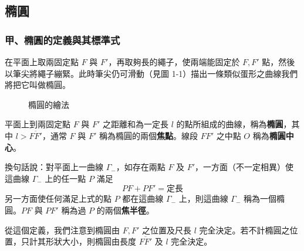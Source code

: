 \subsection{橢圓}
\label{sec:b4-3-1}

\subsubsection*{甲、橢圓的定義與其標準式}

在平面上取兩固定點 $F$ 與 $F'$，再取夠長的繩子，使兩端能固定於 $F, F'$ 點，然後以筆尖將繩子繃緊。此時筆尖仍可滑動（見圖 1-1）描出一條類似蛋形之曲線我們將把它叫做橢圓。

\begin{figure}[htbp]
\centering
{}
\caption{橢圓的繪法}
\label{fig:b4-3-1}
\end{figure}

\begin{definition*}
平面上到兩固定點 $F$ 與 $F'$ 之距離和為一定長 $l$ 的點所組成的曲線，稱為\textbf{橢圓}，其中 $l > \overline{FF'}$，通常 $F$ 與 $F'$ 稱為橢圓的兩個\textbf{焦點}。線段 $FF'$ 之中點 $O$ 稱為\textbf{橢圓中心}。

換句話說：對平面上一曲線 $\Gamma_-$，如存在兩點 $F$ 及 $F'$，一方面（不一定相異）使這曲線 $\Gamma_-$ 上的任一點 $P$ 滿足
\begin{equation}
PF + PF' = \text{定長} \label{eq:b4-3-1-1}
\end{equation}
另一方面使任何滿足上式的點 $P$ 都在這曲線 $\Gamma_-$ 上，則這曲線 $\Gamma_-$ 稱為一個橢圓。$PF$ 與 $PF'$ 稱為過 $P$ 的兩個\textbf{焦半徑}。
\end{definition*}

從這個定義，我們注意到橢圓由 $F, F'$ 之位置及尺長 $l$ 完全決定。若不計橢圓之位置，只計其形狀大小，則橢圓由長度 $\overline{FF'}$ 及 $l$ 完全決定。

